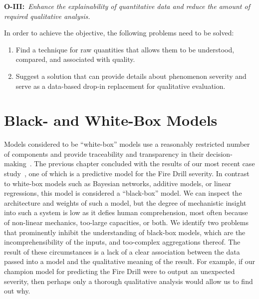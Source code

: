 \vspace{10pt}
\begin{mdframed}
    \textbf{O-III:}~\textit{Enhance the explainability of quantitative data and reduce the amount of required qualitative analysis.}
\end{mdframed}
\vspace{5pt}

\noindent In order to achieve the objective, the following problems need to be solved:

\begin{enumerate}[itemsep=.5ex, leftmargin=3.5em]
    \item[\textbf{P\=/VI:}] Find a technique for raw quantities that allows them to be understood, compared, and associated with quality.
    \item[\textbf{P\=/VII:}] Suggest a solution that can provide details about phenomenon severity and serve as a data-based drop-in replacement for qualitative evaluation.
\end{enumerate}


\section{Black- and White-Box Models}
%
Models considered to be ``white-box'' models use a reasonably restricted number of components and provide traceability and transparency in their decision-making~\cite{Rai2019xai}.
The previous chapter concluded with the results of our most recent case study~, one of which is a predictive model for the Fire Drill severity.
In contrast to white-box models such as Bayesian networks, additive models, or linear regressions, this model is considered a ``black-box'' model.
We can inspect the architecture and weights of such a model, but the degree of mechanistic insight into such a system is low as it defies human comprehension, most often because of non-linear mechanics, too-large capacities, or both.
We identify two problems that prominently inhibit the understanding of black-box models, which are the incomprehensibility of the inputs, and  too-complex aggregations thereof.
The result of these circumstances is a lack of a clear association between the data passed into a model and the qualitative meaning of the result.
For example, if our champion model for predicting the Fire Drill were to output an unexpected severity, then perhaps only a thorough qualitative analysis would allow us to find out why.



